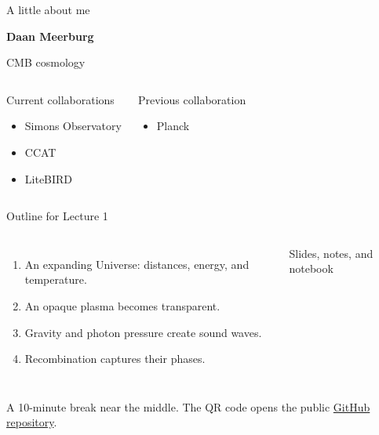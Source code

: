 
\begin{frame}[t]{A little about me}
\begin{center}
{\Large\bfseries Daan Meerburg}\par
\smallskip CMB cosmology
\end{center}
\begin{columns}[T]
\begin{block}{Current collaborations}
\begin{itemize}
\item Simons Observatory
\item CCAT
\item LiteBIRD
\end{itemize}
\end{block}
\begin{block}{Previous collaboration}
\begin{itemize}
\item Planck
\end{itemize}
\end{block}
\end{columns}
\end{frame}

\begin{frame}{Outline for Lecture 1}
\begin{columns}[T]
\begin{enumerate}
\item An expanding Universe: distances, energy, and temperature.
\item An opaque plasma becomes transparent.
\item Gravity and photon pressure create sound waves.
\item Recombination captures their phases.
\end{enumerate}
\centering
{}
\par\smallskip
\scriptsize Slides, notes, and notebook
\end{columns}
\smallskip A 10-minute break near the middle. The QR code opens the public \href{https://github.com/daanmeerburg/RTG_3186_CMB_Lectures}{GitHub repository}.
\end{frame}


